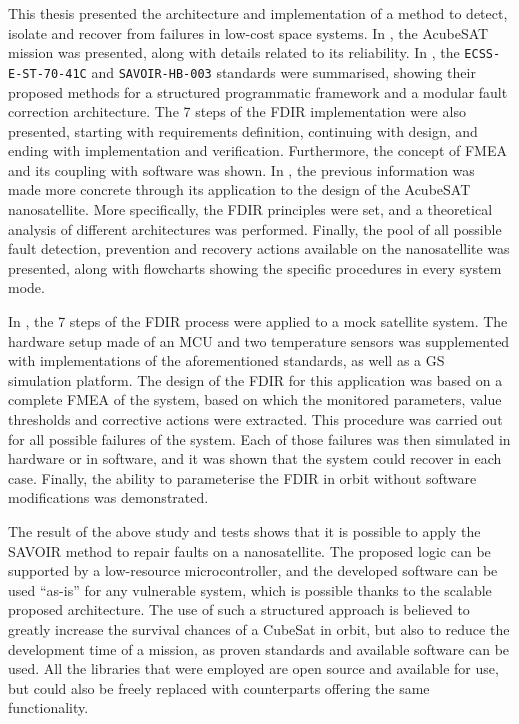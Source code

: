 \documentclass[a4paper,nobib,final]{tufte-book}
\begin{document}
\begin{fullwidth}
This thesis presented the architecture and implementation of a method to detect, isolate and recover from failures in low-cost space systems. In , the AcubeSAT mission was presented, along with details related to its reliability. In , the \texttt{ECSS-E-ST-70-41C} and \texttt{SAVOIR-HB-003} standards were summarised, showing their proposed methods for a structured programmatic framework and a modular fault correction architecture. The 7 steps of the \acs{FDIR} implementation were also presented, starting with requirements definition, continuing with design, and ending with implementation and verification. Furthermore, the concept of \acf{FMEA} and its coupling with software was shown. In , the previous information was made more concrete through its application to the design of the AcubeSAT nanosatellite. More specifically, the \acs{FDIR} principles were set, and a theoretical analysis of different architectures was performed. Finally, the pool of all possible fault detection, prevention and recovery actions available on the nanosatellite was presented, along with flowcharts showing the specific procedures in every system mode.

In , the 7 steps of the \acs{FDIR} process were applied to a mock satellite system. The hardware setup made of an \acs{MCU} and two temperature sensors was supplemented with implementations of the aforementioned standards, as well as a \acl{GS} simulation platform. The design of the \acs{FDIR} for this application was based on a complete \acs{FMEA} of the system, based on which the monitored parameters, value thresholds and corrective actions were extracted. This procedure was carried out for all possible failures of the system. Each of those failures was then simulated in hardware or in software, and it was shown that the system could recover in each case. Finally, the ability to parameterise the \acs{FDIR} in orbit without software modifications was demonstrated.

The result of the above study and tests shows that it is possible to apply the \acs{SAVOIR} method to repair faults on a nanosatellite. The proposed logic can be supported by a low-resource microcontroller, and the developed software can be used ``as-is'' for any vulnerable system, which is possible thanks to the scalable proposed architecture. The use of such a structured approach is believed to greatly increase the survival chances of a CubeSat in orbit, but also to reduce the development time of a mission, as proven standards and available software can be used. All the libraries that were employed are open source and available for use, but could also be freely replaced with counterparts offering the same functionality.


\end{fullwidth}
\end{document}
